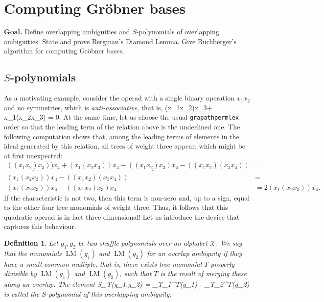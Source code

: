 \documentclass[fleqn, a4paper, twoside]{article}
\makeatletter
\newcommand{\leadm}[1]{\operatorname{LM}(#1)}
\newcommand{\repl}[3]{\square_{#1}^{#2}(#3)}
\newcommand{\0}{\langle 0\rangle}
\newcommand{\XX}{\mathcal{X}}
\let\[\@undefined
\DeclareRobustCommand{\[}{\begin{equation}}%
\let\]\@undefined
\DeclareRobustCommand{\]}{\end{equation}}%
\theoremstyle{mytheorem}
\theoremstyle{introthm}
\newcommand{\hacer}[1]{\todo[inline,linecolor= mpg-gruen,backgroundcolor=mpg-gruen!25!white,bordercolor=mpg-gruen]{#1}}
\theoremstyle{mydefinition}
\newtheorem{definition}[theorem]{Definition}
\theoremstyle{mydefinition2}
\theoremstyle{plain} %
\newcommand{\?}{\,?\,}
\theoremstyle{mytheorem}
\theoremstyle{plain} %
\newcommand\blankpage{%
    \null
    \thispagestyle{empty}%
    \newpage}
\makeatother
\begin{document}
\hacer{More exercises for Section 8} 

\newpage

\section{Computing Gr\"obner bases}\label{lecture:GB2}

\textbf{Goal.} 
Define overlapping ambiguities and $S$-polynomials of overlapping
ambiguities. State and prove Bergman's Diamond Lemma. 
Give Buchberger's algorithm for computing Gr\"obner bases.

\subsection{$S$-polynomials}

As a motivating example, consider the operad
with a single binary operation $x_1x_2$ and no
symmetries, which is \emph{anti-associative}, that is,
\[
\underline{(x_1x_2)x_3}+ x_1(x_2x_3)  = 0.
\] 
At the same time, let us choose the usual \texttt{grapathpermlex}
order so that the leading term of the relation above
is the underlined one. The following computation shows that,
among the leading terms of elements in the ideal
generated by this relation, all trees of weight three appear,
which might be at first unexpected:
\begin{align*}
\underline{((x_1x_2)x_3))x_4} + (x_1(x_2x_3))x_4 -
\underline{((x_1x_2)x_3)x_4}- ((x_1 x_2)(x_3x_4)) &=  \\
 (x_1(x_2x_3))x_4 - ((x_1 x_2)(x_3x_4)) &= \\
 (x_1(x_2x_3))x_4 - ((x_1 x_2)x_3)x_4 &=  2(x_1(x_2x_3))x_4.
\end{align*}
If the characteristic is not two, then this term is non-zero
and, up to a sign, equal to the other four tree monomials
of weight three. Thus, it follows that this quadratic operad
is in fact three dimensional! Let us introduce the device 
that captures this behaviour.

\begin{definition}
Let $g_1,g_2$ be two shuffle polynomials over an alphabet $\XX$.
We say that the monomials $\leadm{g_1}$ and $\leadm{g_2}$ for
an overlap ambiguity if they have a \emph{small common multiple},
that is, there exists tree monomial $T$ properly divisible by  
$\leadm{g_1}$ and $\leadm{g_2}$, such that $T$ is the result
of merging these along an overlap. The element
\[
S_T(g_1,g_2) = 
\repl{T_1}{T}{g_1} - \repl{T_2}{T}{g_2}	
\]
is called the $S$-polynomial of this overlapping ambiguity.
\end{definition}
\end{document}
